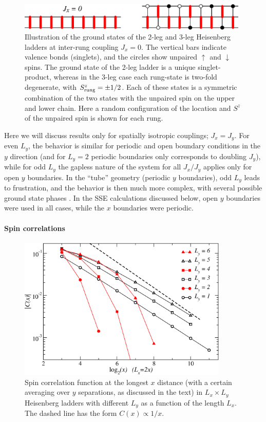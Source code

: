 \documentclass[draft,numberedheadings]{aipproc}
\newcommand{\dn}{\downarrow}
\newcommand{\up}{\uparrow}
\begin{document}
\begin{figure}
\includegraphics[width=11cm, clip]{laddervb.eps}
\caption{Illustration of the ground states of the 2-leg and 3-leg Heisenberg ladders at inter-rung coupling $J_x=0$. The vertical bars indicate valence 
bonds (singlets), and the circles show unpaired $\up$ and $\dn$ spins. The ground state of the 2-leg ladder is a unique singlet-product, whereas in the 
3-leg case each rung-state is two-fold degenerate, with $S^z_{\rm rung} = \pm 1/2$. Each of these states is a symmetric combination of the two states with 
the unpaired spin on the upper and lower chain. Here a random configuration of the location and $S^z$ of the unpaired spin is shown for each rung.}
\label{laddervb}
\end{figure}

Here we will discuss results only for spatially isotropic couplings; $J_x = J_y$. For even $L_y$, the behavior is similar for periodic and open boundary
conditions in the $y$ direction (and for $L_y=2$ periodic boundaries only corresponds to doubling $J_y$), while for odd $L_y$ the gapless nature of the
system for all $J_x/J_y$ applies only for open $y$ boundaries. In the ``tube'' geometry (periodic $y$ boundaries), odd $L_y$ leads to frustration, and the
behavior is then much more complex, with several possible ground state phases \cite{sakai08}. In the SSE calculations discussed below, open $y$ boundaries 
were used in all cases, while the $x$ boundaries were periodic. 

\paragraph{Spin correlations}

\begin{figure}
\includegraphics[width=10cm, clip]{laddcorr.eps}
\caption{Spin correlation function at the longest $x$ distance (with a certain averaging over $y$ separations, as discussed in the text) in $L_x\times L_y$ 
Heisenberg ladders with different $L_y$ as a function of the length $L_x$. The dashed line has the form $C(x) \propto 1/x$.}
\label{laddcorr}
\end{figure}
\end{document}

